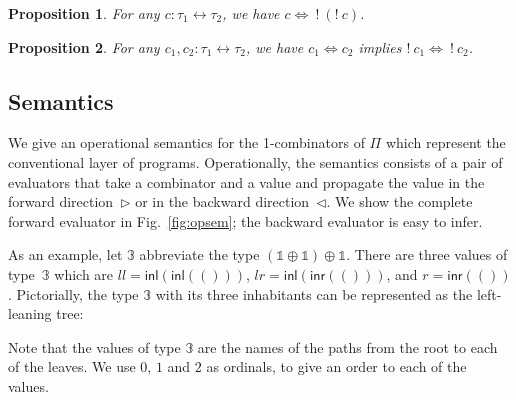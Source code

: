 \documentclass[a4paper,USenglish]{lipics-v2016-utf8x}
\newcommand{\iso}{\leftrightarrow}
\newcommand{\isotwo}{\Leftrightarrow}
\newcommand{\inl}[1]{\textsf{inl}(#1)}
\newcommand{\inr}[1]{\textsf{inr}(#1)}
\newcommand{\ot}{\mathbb{1}}
\newcommand{\unitv}{()}
\newtheorem{proposition}{Proposition}
\begin{document}
\begin{proposition}
For any $c : \tau_1 \iso \tau_2$, we have $c \isotwo ~!~(!~c)$.
\end{proposition}

\begin{proposition}
For any $c_1,c_2 : \tau_1 \iso \tau_2$, we have $c_1 \isotwo c_2$ implies
$!~c_1 \isotwo ~!~c_2$.
\end{proposition}

\subsection{Semantics}
\label{sec:pisem}

We give an operational semantics for the 1-combinators of $\Pi$ which
represent the conventional layer of programs.  Operationally, the
semantics consists of a pair of evaluators that
take a combinator and a value and propagate the value in the forward
direction~$\triangleright$ or in the backward
direction~$\triangleleft$. We show the complete forward evaluator in
Fig.~\ref{fig:opsem}; the backward evaluator is easy to infer.

As an example, let $\mathbb{3}$ abbreviate the type
$(\ot \oplus \ot) \oplus \ot$. There are three values of
type~$\mathbb{3}$ which are $ll=\inl{\inl{\unitv}}$,
$lr=\inl{\inr{\unitv}}$, and $r=\inr{\unitv}$. Pictorially, the type
$\mathbb{3}$ with its three inhabitants can be represented as the
left-leaning tree:
\begin{center}
\end{center}
Note that the values of type $\mathbb{3}$ are the names of
the paths from the root to each of the leaves.  We use
$0$, $1$ and $2$ as ordinals, to give an order to each
of the values.
\end{document}
